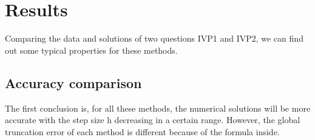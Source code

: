 \documentclass[a4paper]{article}
\begin{document}
	
	\section{Results}
	Comparing the data and solutions of two questions IVP1 and IVP2, we can find out some typical properties for these methods.
	
	
	\subsection{Accuracy comparison}
	
	The first conclusion is, for all these methods, the numerical solutions will be more accurate with the step size h decreasing in a certain range. 
	However, the global truncation error of each method is different because of the formula inside. 
	
\end{document}
